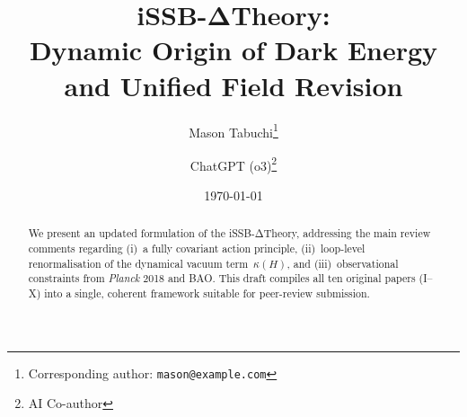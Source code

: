 \documentclass[11pt,a4paper]{article}
\begin{document}
\title{\bfseries iSSB-ΔTheory:\\
Dynamic Origin of Dark Energy and Unified Field Revision}
\author[1]{Mason Tabuchi\thanks{Corresponding author: \texttt{mason@example.com}}}
\author[2]{ChatGPT (o3)\thanks{AI Co-author}}
\date{\today}
\maketitle

\begin{abstract}
We present an updated formulation of the iSSB-ΔTheory, addressing the
main review comments regarding (i)~a fully covariant action principle,
(ii)~loop-level renormalisation of the dynamical vacuum term~$\kappa(H)$,
and (iii)~observational constraints from \textit{Planck} 2018 and BAO.
This draft compiles all ten original papers (I–X) into a single, coherent
framework suitable for peer-review submission.
\end{abstract}

\tableofcontents
\newpage



\end{document}
